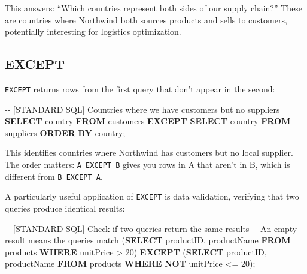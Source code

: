 \documentclass[
  letterpaper,
  DIV=11,
  numbers=noendperiod]{scrreprt}
\newenvironment{Shaded}{\begin{snugshade}}{\end{snugshade}}
\newcommand{\CommentTok}[1]{\textcolor[rgb]{0.37,0.37,0.37}{#1}}
\newcommand{\DecValTok}[1]{\textcolor[rgb]{0.68,0.00,0.00}{#1}}
\newcommand{\KeywordTok}[1]{\textcolor[rgb]{0.00,0.23,0.31}{\textbf{#1}}}
\newcommand{\NormalTok}[1]{\textcolor[rgb]{0.00,0.23,0.31}{#1}}
\newcommand{\OperatorTok}[1]{\textcolor[rgb]{0.37,0.37,0.37}{#1}}
\begin{document}
This answers: ``Which countries represent both sides of our supply
chain?'' These are countries where Northwind both sources products and
sells to customers, potentially interesting for logistics optimization.

\subsection{EXCEPT}\label{except}

\texttt{EXCEPT} returns rows from the first query that don't appear in
the second:

\begin{codelisting}

\caption{\texttt{duckdb}}

\begin{Shaded}
\begin{Highlighting}[]
\CommentTok{{-}{-} [STANDARD SQL] Countries where we have customers but no suppliers}
\KeywordTok{SELECT}\NormalTok{ country }\KeywordTok{FROM}\NormalTok{ customers}
\KeywordTok{EXCEPT}
\KeywordTok{SELECT}\NormalTok{ country }\KeywordTok{FROM}\NormalTok{ suppliers}
\KeywordTok{ORDER} \KeywordTok{BY}\NormalTok{ country;}
\end{Highlighting}
\end{Shaded}

\end{codelisting}

This identifies countries where Northwind has customers but no local
supplier. The order matters: \texttt{A\ EXCEPT\ B} gives you rows in A
that aren't in B, which is different from \texttt{B\ EXCEPT\ A}.

A particularly useful application of \texttt{EXCEPT} is data validation,
verifying that two queries produce identical results:

\begin{codelisting}

\caption{\texttt{duckdb}}

\begin{Shaded}
\begin{Highlighting}[]
\CommentTok{{-}{-} [STANDARD SQL] Check if two queries return the same results}
\CommentTok{{-}{-} An empty result means the queries match}
\NormalTok{(}\KeywordTok{SELECT}\NormalTok{ productID, productName }\KeywordTok{FROM}\NormalTok{ products }\KeywordTok{WHERE}\NormalTok{ unitPrice }\OperatorTok{\textgreater{}} \DecValTok{20}\NormalTok{)}
\KeywordTok{EXCEPT}
\NormalTok{(}\KeywordTok{SELECT}\NormalTok{ productID, productName }\KeywordTok{FROM}\NormalTok{ products }\KeywordTok{WHERE} \KeywordTok{NOT}\NormalTok{ unitPrice }\OperatorTok{\textless{}=} \DecValTok{20}\NormalTok{);}
\end{Highlighting}
\end{Shaded}

\end{codelisting}
\end{document}
